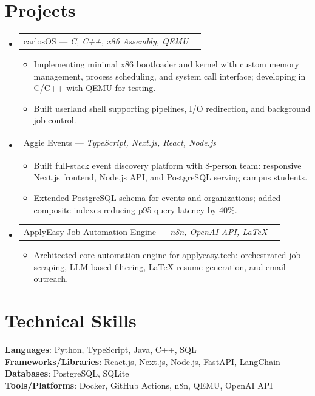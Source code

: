 \documentclass[letterpaper,11pt]{article}
\makeatletter
\newcommand{\resumeItem}[1]{%
  \item\small{{#1 \vspace{-2pt}}}
}
\newcommand{\resumeProjectHeading}[2]{%
    \item
    \begin{tabular*}{0.97\textwidth}{l@{\extracolsep{\fill}}r}
      \small#1 & #2 \\
    \end{tabular*}\vspace{-7pt}
}
\newcommand{\resumeSubHeadingListStart}{\begin{itemize}[leftmargin=0.15in, label={}]}
\newcommand{\resumeSubHeadingListEnd}{\end{itemize}}
\newcommand{\resumeItemListStart}{\begin{itemize}}
\newcommand{\resumeItemListEnd}{\end{itemize}\vspace{-5pt}}
\makeatother
\begin{document}
\section{Projects}
\resumeSubHeadingListStart

\resumeProjectHeading
{carlosOS — \emph{C, C++, x86 Assembly, QEMU}}{}
\resumeItemListStart
\resumeItem{Implementing minimal x86 bootloader and kernel with custom memory management, process scheduling, and system call interface; developing in C/C++ with QEMU for testing.}
\resumeItem{Built userland shell supporting pipelines, I/O redirection, and background job control.}
\resumeItemListEnd

\resumeProjectHeading
{Aggie Events — \emph{TypeScript, Next.js, React, Node.js}}{}
\resumeItemListStart
\resumeItem{Built full-stack event discovery platform with 8-person team: responsive Next.js frontend, Node.js API, and PostgreSQL serving campus students.}
\resumeItem{Extended PostgreSQL schema for events and organizations; added composite indexes reducing p95 query latency by 40\%.}
\resumeItemListEnd

\resumeProjectHeading
{ApplyEasy Job Automation Engine — \emph{n8n, OpenAI API, LaTeX}}{}
\resumeItemListStart
\resumeItem{Architected core automation engine for applyeasy.tech: orchestrated job scraping, LLM-based filtering, LaTeX resume generation, and email outreach.}
\resumeItemListEnd

\resumeSubHeadingListEnd

\section{Technical Skills}
\begin{itemize}[leftmargin=0.15in, label={}]
  \small{\item{
    \textbf{Languages}{: Python, TypeScript, Java, C++, SQL} \\
    \textbf{Frameworks/Libraries}{: React.js, Next.js, Node.js, FastAPI, LangChain} \\
    \textbf{Databases}{: PostgreSQL, SQLite} \\
    \textbf{Tools/Platforms}{: Docker, GitHub Actions, n8n, QEMU, OpenAI API}
  }}
\end{itemize}
\end{document}
